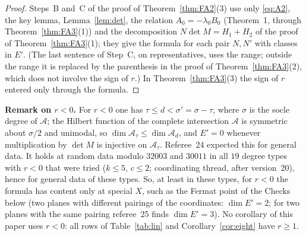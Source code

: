 \documentclass[11pt]{article}
\numberwithin{equation}{section}
\theoremstyle{remark}
\newcommand{\cA}{\mathcal{A}}
\newcommand{\lz}{\lambda_0}
\newcommand{\run}[1]{\medskip\noindent\textbf{#1}}
\begin{document}
\begin{proof}
Steps~B and~C of the proof of Theorem~\ref{thm:FA2}(3) use only \eqref{eq:A2}, the key lemma, Lemma~\ref{lem:det},
the relation $A_0=-\lz B_0$ (Theorem~1, through Theorem~\ref{thm:FA3}(1)) and the decomposition $N\det M=H_1+H_2$
of the proof of Theorem~\ref{thm:FA3}(1); they give the formula for each pair $N,N'$ with classes in $E'$. (The
last sentence of Step~C, on representatives, uses the range; outside the range it is replaced by the
parenthesis in the proof of Theorem~\ref{thm:FA3}(2), which does not involve the sign of $r$.) In Theorem~\ref{thm:FA3}(3) the sign of $r$ entered only through the formula.
\end{proof}

\run{Remark on $r<0$.} For $r<0$ one has $\tau\le d<\sigma'=\sigma-\tau$, where $\sigma$ is the socle degree of $\cA$; the Hilbert function
of the complete intersection $\cA$ is symmetric about $\sigma/2$ and unimodal, so $\dim\cA_\tau\le\dim\cA_d$, and
$E'=0$ whenever multiplication by $\det M$ is injective on $\cA_\tau$. Referee~24 expected this for general data. It holds at random data modulo $32003$
and $30011$ in all $19$ degree types with $r<0$ that were tried ($k\le5$, $c\le2$; coordinating thread, after
version~20), hence for general data of these types. So, at least in these types, for $r<0$ the
formula has content only at special $X$, such as the Fermat point of the Checks below (two planes with different pairings of the coordinates:
$\dim E'=2$; for two planes with the same pairing referee~25 finds $\dim E'=3$). No
corollary of this paper uses $r<0$: all rows of Table~\ref{tab:lin} and Corollary~\ref{cor:eight} have $r\ge1$.
\end{document}
